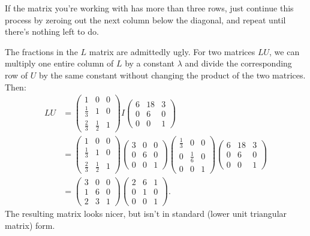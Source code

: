 If the matrix you're working with has more than three rows, just continue this process by zeroing out the next column below the diagonal, and repeat until there's nothing left to do.


The fractions in the $L$ matrix are admittedly ugly.  For two matrices $LU$, we can multiply one entire column of $L$ by a constant $\lambda$ and divide the corresponding row of $U$ by the same constant without changing the product of the two matrices.  Then:
\begin{align*}
LU &= \begin{pmatrix}
1 & 0 & 0 \\[1mm]
\frac{1}{3} & 1 & 0 \\[1mm]
\frac{2}{3} & \frac{1}{2} & 1 
\end{pmatrix}
I
\begin{pmatrix}
6 & 18 & 3 \\
0 & 6 & 0 \\
0 & 0 & 1 
\end{pmatrix} \\
&=
\begin{pmatrix}
1 & 0 & 0 \\[1mm]
\frac{1}{3} & 1 & 0 \\[1mm]
\frac{2}{3} & \frac{1}{2} & 1 
\end{pmatrix}
\begin{pmatrix}
3 & 0 & 0 \\
0 & 6 & 0 \\
0 & 0 & 1 
\end{pmatrix}
\begin{pmatrix}
\frac{1}{3} & 0 & 0 \\[1mm]
0 & \frac{1}{6} & 0 \\[1mm]
0 & 0 & 1 
\end{pmatrix}
\begin{pmatrix}
6 & 18 & 3 \\
0 & 6 & 0 \\
0 & 0 & 1 
\end{pmatrix} \\
&=
\begin{pmatrix}
3 & 0 & 0 \\
1 & 6 & 0 \\
2 & 3 & 1 
\end{pmatrix}\begin{pmatrix}
2 & 6 & 1 \\
0 & 1 & 0 \\
0 & 0 & 1 
\end{pmatrix}.
\end{align*}
The resulting matrix looks nicer, but isn't in standard (lower unit triangular matrix) form.

